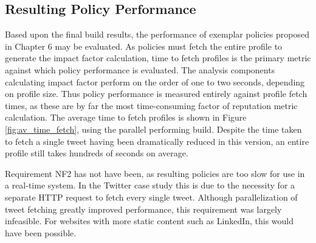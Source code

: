 



\subsection{Resulting Policy Performance}

Based upon the final build results, the performance of exemplar policies proposed in Chapter 6 may be evaluated. As policies must fetch the entire profile to generate the impact factor calculation, time to fetch profiles is the primary metric against which policy performance is evaluated. The analysis components calculating impact factor perform on the order of one to two seconds, depending on profile size. Thus policy performance is measured entirely against profile fetch times, as these are by far the most time-consuming factor of reputation metric calculation. The average time to fetch profiles is shown in Figure \ref{fig:av_time_fetch}, using the parallel performing build. Despite the time taken to fetch a single tweet having been dramatically reduced in this version, an entire profile still takes hundreds of seconds on average.

Requirement NF2 has not have been, as resulting policies are too slow for use in a real-time system. In the Twitter case study this is due to the necessity for a separate HTTP request to fetch every single tweet. Although parallelization of tweet fetching greatly improved performance, this requirement was largely infeasible. For websites with more static content such as LinkedIn, this would have been possible.


